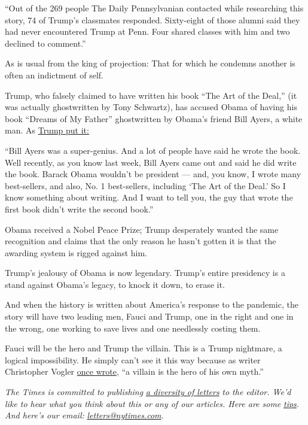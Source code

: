 ``Out of the 269 people The Daily Pennsylvanian contacted while
researching this story, 74 of Trump's classmates responded. Sixty-eight
of those alumni said they had never encountered Trump at Penn. Four
shared classes with him and two declined to comment.''

As is usual from the king of projection: That for which he condemns
another is often an indictment of self.

Trump, who falsely claimed to have written his book ``The Art of the
Deal,'' (it was actually ghostwritten by Tony Schwartz), has accused
Obama of having his book ``Dreams of My Father'' ghostwritten by Obama's
friend Bill Ayers, a white man. As
\href{https://www.huffpost.com/entry/donald-trump-bill-ayers_n_57e0220de4b04a1497b5ca8f?guccounter=1\&guce_referrer=aHR0cHM6Ly93d3cuZ29vZ2xlLmNvbS8\&guce_referrer_sig=AQAAAGl3RCEp7h2PcIUKjr9AbRcAH9kPAspRVeZwTGGh3FtLNjnUrQWzrMioFdXowlH0UYzSxOlNYzpaNN_uUuuBeP0AdvQ8DxqURqt7OaOsOomlud8ePuEhUx3CypWcnBqrjtUXhn7STBenh5UHWKLCQAfugFk1iINeMW5BOWZyQ6qV}{Trump
put it:}

``Bill Ayers was a super-genius. And a lot of people have said he wrote
the book. Well recently, as you know last week, Bill Ayers came out and
said he did write the book. Barack Obama wouldn't be president --- and,
you know, I wrote many best-sellers, and also, No. 1 best-sellers,
including `The Art of the Deal.' So I know something about writing. And
I want to tell you, the guy that wrote the first book didn't write the
second book.''

Obama received a Nobel Peace Prize; Trump desperately wanted the same
recognition and claims that the only reason he hasn't gotten it is that
the awarding system is rigged against him.

Trump's jealousy of Obama is now legendary. Trump's entire presidency is
a stand against Obama's legacy, to knock it down, to erase it.

And when the history is written about America's response to the
pandemic, the story will have two leading men, Fauci and Trump, one in
the right and one in the wrong, one working to save lives and one
needlessly costing them.

Fauci will be the hero and Trump the villain. This is a Trump nightmare,
a logical impossibility. He simply can't see it this way because as
writer Christopher Vogler
\href{http://craftywriters.club/reading/christopher-vogler-the-writers-journey.pdf}{once
wrote}, ``a villain is the hero of his own myth.''

\emph{The Times is committed to publishing}
\href{https://www.nytimes.com/2019/01/31/opinion/letters/letters-to-editor-new-york-times-women.html}{\emph{a
diversity of letters}} \emph{to the editor. We'd like to hear what you
think about this or any of our articles. Here are some}
\href{https://help.nytimes.com/hc/en-us/articles/115014925288-How-to-submit-a-letter-to-the-editor}{\emph{tips}}\emph{.
And here's our email:}
\href{mailto:letters@nytimes.com}{\emph{letters@nytimes.com}}\emph{.}

